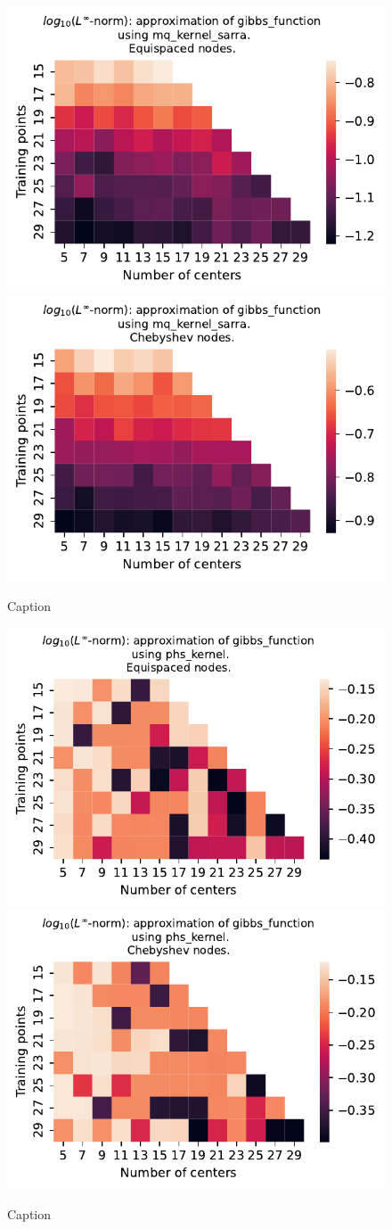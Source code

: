 \documentclass[12pt]{report} %
\begin{document}
\begin{figure}[ht]
  \centering

  \includegraphics[width=.49\textwidth]{imagenes/experiments/1d/variational/gibbs_function-Kmq_kernel_sarra-Equi.pdf}
  \includegraphics[width=.49\textwidth]{imagenes/experiments/1d/variational/gibbs_function-Kmq_kernel_sarra-Cheb.pdf}
  \caption{Caption}
  \label{fig:gibbs-sarra}
\end{figure}

\begin{figure}[ht]
  \centering

  \includegraphics[width=.49\textwidth]{imagenes/experiments/1d/variational/gibbs_function-Kphs_kernel-Equi.pdf}
  \includegraphics[width=.49\textwidth]{imagenes/experiments/1d/variational/gibbs_function-Kphs_kernel-Cheb.pdf}
  \caption{Caption}
  \label{fig:gibbs-phs}
\end{figure}
\end{document}
